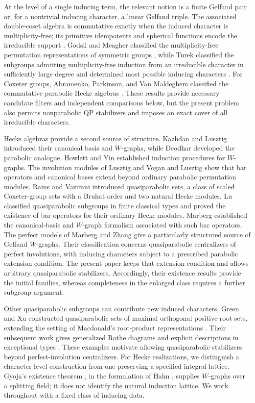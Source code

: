 \documentclass[11pt]{article}
\numberwithin{equation}{section}
\theoremstyle{definition}
\begin{document}
At the level of a single inducing term, the relevant notion is a finite Gelfand pair or, for a nontrivial inducing character, a linear Gelfand triple.
The associated double-coset algebra is commutative exactly when the induced character is multiplicity-free; its primitive idempotents and spherical functions encode the irreducible support \cite{StembridgeQ,CSST}.
Godsil and Meagher classified the multiplicity-free permutation representations of symmetric groups \cite{GodsilMeagher}, while Turek classified the subgroups admitting multiplicity-free induction from an irreducible character in sufficiently large degree and determined most possible inducing characters \cite{Turek}.
For Coxeter groups, Abramenko, Parkinson, and Van Maldeghem classified the commutative parabolic Hecke algebras \cite{APVM}.
These results provide necessary candidate filters and independent comparisons below, but the present problem also permits nonparabolic QP stabilizers and imposes an exact cover of all irreducible characters.

Hecke algebras provide a second source of structure.
Kazhdan and Lusztig \cite{KL} introduced their canonical basis and \(W\)-graphs, while Deodhar \cite{Deodhar} developed the parabolic analogue.
Howlett and Yin \cite{HY1,HY2} established induction procedures for \(W\)-graphs.
The involution modules of Lusztig and Vogan \cite{LV} and Lusztig \cite{Lusztig} show that bar operators and canonical bases extend beyond ordinary parabolic permutation modules.
Rains and Vazirani \cite{RV} introduced quasiparabolic sets, a class of scaled Coxeter-group sets with a Bruhat order and two natural Hecke modules.
Lu \cite{Lu} classified quasiparabolic subgroups in finite classical types and proved the existence of bar operators for their ordinary Hecke modules.
Marberg \cite{MarbergBar} established the canonical-basis and \(W\)-graph formalism associated with such bar operators.
The perfect models of Marberg and Zhang \cite{MZgraphs,MZperfect} give a particularly structured source of Gelfand \(W\)-graphs.
Their classification concerns quasiparabolic centralizers of perfect involutions, with inducing characters subject to a prescribed parabolic extension condition.
The present paper keeps that extension condition and allows arbitrary quasiparabolic stabilizers.
Accordingly, their existence results provide the initial families, whereas completeness in the enlarged class requires a further subgroup argument.

Other quasiparabolic subgroups can contribute new induced characters.
Green and Xu \cite{GXroots} constructed quasiparabolic sets of maximal orthogonal positive-root sets, extending the setting of Macdonald's root-product representations \cite{MacdonaldRoots}.
Their subsequent work gives generalized Rothe diagrams and explicit descriptions in exceptional types \cite{GXRothe,GXFano}.
These examples motivate allowing quasiparabolic stabilizers beyond perfect-involution centralizers.
For Hecke realizations, we distinguish a character-level construction from one preserving a specified integral lattice.
Gyoja's existence theorem \cite{Gyoja}, in the formulation of Hahn \cite{Hahn}, supplies \(W\)-graphs over a splitting field; it does not identify the natural induction lattice.
We work throughout with a fixed class of inducing data.
\end{document}
